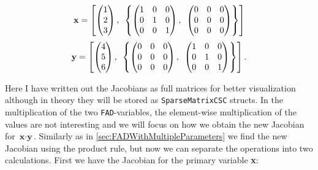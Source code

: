 \begin{multicols}{2}
    \noindent
    \begin{align*}
        \textbf{x} = \left[\begin{pmatrix}1\\2\\3
        \end{pmatrix},\hspace{0.5em}\left\{
        \begin{pmatrix}
        1&0&0\\
        0&1&0\\
        0&0&1\end{pmatrix},\hspace{0.5em}\begin{pmatrix}
        0&0&0\\
        0&0&0\\
        0&0&0
        \end{pmatrix}\right\} \right]
    \end{align*}
    \begin{align*}
        \textbf{y} = \left[\begin{pmatrix}4\\5\\6
        \end{pmatrix},\hspace{0.5em}\left\{
        \begin{pmatrix}
        0&0&0\\
        0&0&0\\
        0&0&0\end{pmatrix},\hspace{0.5em}\begin{pmatrix}
        1&0&0\\
        0&1&0\\
        0&0&1
        \end{pmatrix}\right\} \right].
    \end{align*}
\end{multicols}
Here I have written out the Jacobians as full matrices for better visualization although in theory they will be stored as \texttt{SparseMatrixCSC} structs. In the multiplication of the two \texttt{FAD}-variables, the element-wise multiplication of the values are not interesting and we will focus on how we obtain the new Jacobian for $\textbf{x}\cdot \textbf{y}$. Similarly as in \autoref{sec:FADWithMultipleParameters} we find the new Jacobian using the product rule, but now we can separate the operations into two calculations. First we have the Jacobian for the primary variable \textbf{x}:
